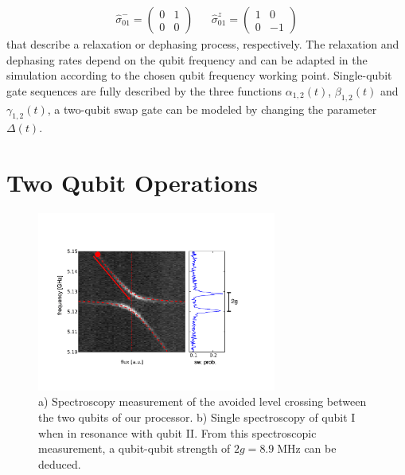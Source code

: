 %
\begin{align}
\hat{\sigma}_{01}^-  =  \left( \begin{array}{cc} 0 & 1 \\ 0 & 0 \end{array} \right) & & \hat{\sigma}_{01}^z  =  \left( \begin{array}{cc} 1 & 0 \\ 0 & -1 \end{array}\right)
\end{align}
%
that describe a relaxation or dephasing process, respectively. The relaxation and dephasing rates depend on the qubit frequency and can be adapted in the simulation according to the chosen qubit frequency working point. Single-qubit gate sequences are fully described by the three functions $\alpha_{1,2}(t)$, $\beta_{1,2}(t)$ and $\gamma_{1,2}(t)$, a two-qubit swap gate can be modeled by changing the parameter $\Delta(t)$.

\section{Two Qubit Operations}

\begin{figure}[ht!]
	\centering
		\includegraphics[width=0.7\textwidth]{"./data/ct5/2011_04_11 - anticrossing/qubit_anticrossing_modified"}
	\caption[Spectroscopic measurement of the avoided level crossing between the two qubits of our processor]{a) Spectroscopy measurement of the avoided level crossing between the two qubits of our processor. b) Single spectroscopy of qubit I when in resonance with qubit II. From this spectroscopic measurement, a qubit-qubit strength of $2g=8.9\;\mathrm{MHz}$ can be deduced. }
	\label{fig:qubit_anticrossing}
\end{figure}

